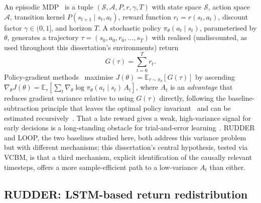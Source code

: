 An episodic MDP~\cite{sutton2018rlbook} is a tuple $(\mathcal{S}, \mathcal{A}, P, r, \gamma, T)$ with state space $\mathcal{S}$, action space $\mathcal{A}$, transition kernel $P(s_{t+1} \mid s_t, a_t)$, reward function $r_t = r(s_t, a_t)$, discount factor $\gamma \in (0,1]$, and horizon $T$. A stochastic policy $\pi_\theta(a_t \mid s_t)$, parameterised by $\theta$, generates a trajectory $\tau = (s_0, a_0, r_0, \dots, s_T)$ with realised (undiscounted, as used throughout this dissertation's environments) return
\begin{equation}
  G(\tau) = \sum_{t=0}^{T} r_t .
  \label{eq:return}
\end{equation}
Policy-gradient methods~\cite{sutton1999policygradient} maximise $J(\theta) = \mathbb{E}_{\tau \sim \pi_\theta}[G(\tau)]$ by ascending $\nabla_\theta J(\theta) = \mathbb{E}_{\tau}\!\left[\sum_t \nabla_\theta \log \pi_\theta(a_t \mid s_t)\, A_t\right]$, where $A_t$ is an \emph{advantage} that reduces gradient variance relative to using $G(\tau)$ directly, following the baseline-subtraction principle that leaves the optimal policy invariant~\cite{ng1999shaping} and can be estimated recursively~\cite{schulman2016gae}. That a late reward gives a weak, high-variance signal for early decisions is a long-standing obstacle for trial-and-error learning~\cite{minsky1961steps}. RUDDER and LOOP, the two baselines studied here, both address this variance problem but with different mechanisms; this dissertation's central hypothesis, tested via VCBM, is that a third mechanism, explicit identification of the causally relevant timesteps, offers a more sample-efficient path to a low-variance $A_t$ than either.

\subsection{RUDDER: LSTM-based return redistribution}
\label{sec:prelim-rudder}

